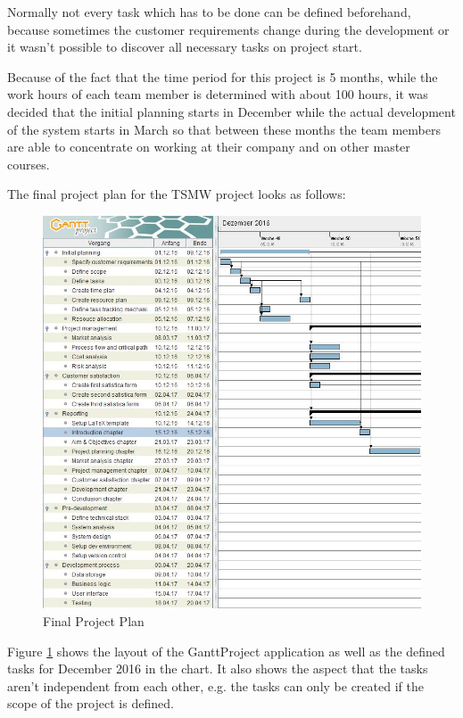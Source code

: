 Normally not every task which has to be done can be defined beforehand, because
sometimes the customer requirements change during the development or it wasn't
possible to discover all necessary tasks on project start.

Because of the fact that the time period for this project is 5 months, while the
work hours of each team member is determined with about 100 hours, it was
decided that the initial planning starts in December while the actual
development of the system starts in March so that between these months the team
members are able to concentrate on working at their company and on other master
courses.

The final project plan for the TSMW project looks as follows: 

\begin{figure}[h!]
  \centering
     \includegraphics[width=1\textwidth]
     {res/projectPlan/timePlan1.JPG}
     \captionsetup{justification=centering}
  \caption{Final Project Plan}
  \label{fig:project plan}
\end{figure}

Figure \ref{fig:project plan} shows the layout of the GanttProject application
as well as the defined tasks for December 2016 in the chart. It also shows the
aspect that the tasks aren't independent from each other, e.g. the tasks can
only be created if the scope of the project is defined.

